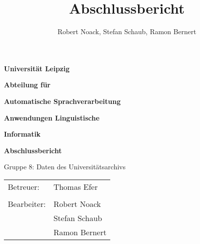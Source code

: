 \documentclass[12pt,a4paper]{article}
\title{Abschlussbericht}
\author{Robert Noack, Stefan Schaub, Ramon Bernert}
\begin{document}
\thispagestyle{empty}


\begin{LARGE}
 \centering
 \vspace*{0.35cm} \textbf{Universität Leipzig}

 \vspace*{0.4cm}
 \textbf{Abteilung für}
 
 \textbf{Automatische Sprachverarbeitung}

 \vspace*{2cm}
 \textbf{Anwendungen Linguistische}

 \textbf{Informatik}

 \vspace*{0.8cm}
 \textbf{Abschlussbericht}

 \vspace*{1cm}
 \hspace*{0.8cm} Gruppe 8: Daten des Universitätsarchivs
\end{LARGE}

\vspace*{\fill}
\begin{large}
 \begin{tabular}{p{7cm} l}
  Betreuer:		& Thomas Efer	\\
\\
  Bearbeiter: 	& Robert Noack 	\\
				& Stefan Schaub \\
				& Ramon Bernert \\
 \end{tabular}
\end{large}


\newpage
\thispagestyle{empty}

\tableofcontents
{}


\newpage
\setcounter{page}{1}







\newpage
\end{document}
